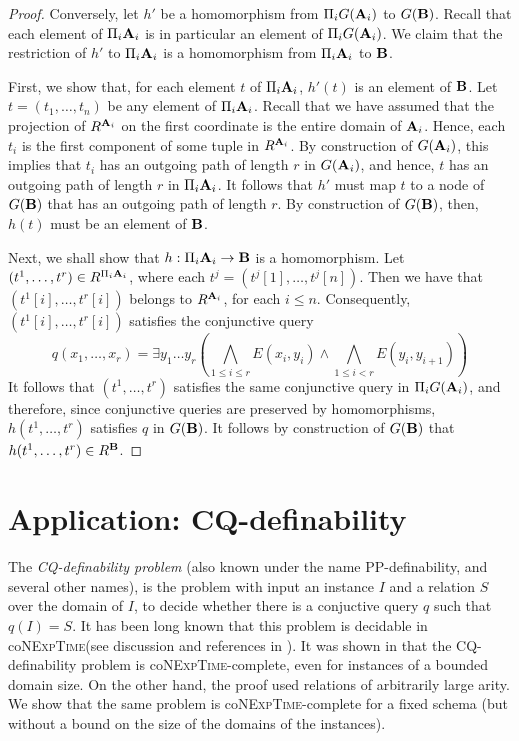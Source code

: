 \documentclass{article}
\newcommand{\aest}{{\bf A}}
\newcommand{\best}{{\bf B}}
\newcommand{\nexptime}{\textsc{NExpTime}\xspace}
\begin{document}
\begin{proof}
 

Conversely, let $h'$ be a homomorphism from $\Pi_i G(\aest_i)$ to
$G(\best)$. Recall that each element of $\Pi_i \aest_i$ is in
particular an element of $\Pi_i G(\aest_i)$.  We claim that the
restriction of $h'$ to $\Pi_i \aest_i$ is a
homomorphism from $\Pi_i \aest_i$ to $\best$. 

First, we show 
that, for each element $t$ of $\Pi_i \aest_i$, $h'(t)$ is an
element of $\best$.
Let $t=(t_1, \ldots, t_n)$ be any element of $\Pi_i \aest_i$.  Recall
that we have assumed that the projection of $R^{\aest_i}$ on the first
coordinate is the entire domain of $\aest_i$. Hence, each $t_i$ is the
first component of some tuple in $R^{\aest_i}$. By construction of
$G(\aest_i)$, this implies that $t_i$ has an outgoing path of length
$r$ in $G(\aest_i)$, and hence, $t$ has an outgoing path of length $r$
in $\Pi_i \aest_i$.  It follows that $h'$ must map $t$ to a node of
$G(\best)$ that has an outgoing path of length $r$. By construction
of $G(\best)$, then, $h(t)$ must be an element of $\best$.

Next, we shall show that $h:\Pi_i\aest_i\to \best$ is a
homomorphism. Let
$(t^1, \ldots, t^r)\in R^{\Pi_i\aest_i}$, where each $t^j = (t^j[1],
\ldots, t^j[n])$. Then we have that
$(t^1[i],\ldots,t^r[i])$ belongs to $R^{\aest_i}$,  for each $i\leq n$.
Consequently, $(t^1[i],\ldots,t^r[i])$ satisfies the conjunctive
query $$q(x_1, \ldots, x_r)=\exists y_1\ldots y_r (\bigwedge_{1\leq
  i\leq r}
E(x_i,y_i)\land\bigwedge_{1\leq i<r} E(y_i,y_{i+1}))$$
It follows that $(t^1, \ldots, t^r)$ satisfies the same conjunctive
query in $\Pi_i G(\aest_i)$, and therefore, since conjunctive
queries are preserved by homomorphisms, 
$h(t^1, \ldots, t^r)$ satisfies $q$ in $G(\best)$. It follows by
construction of $G(\best)$ that $h(t^1, \ldots, t^r)\in R^\best$.
\end{proof}













\section{Application: CQ-definability}



The \emph{CQ-definability problem} (also known under the name
PP-definability, and several other names), is the problem with input an instance $I$ and a relation $S$
over the domain of $I$, to decide whether there is a conjuctive query
$q$ such that $q(I)=S$.  It has been long known that this problem is
decidable in co\nexptime (see discussion and references in
\cite{Willard10}). It was shown in \cite{Willard10} that the
CQ-definability problem is co\nexptime-complete, even for instances of
a bounded domain size. On the other hand, the proof used relations of
arbitrarily large arity. We show that  the same problem is
co\nexptime-complete for a fixed schema (but without a bound on the
size of the domains of the instances).
\end{document}
